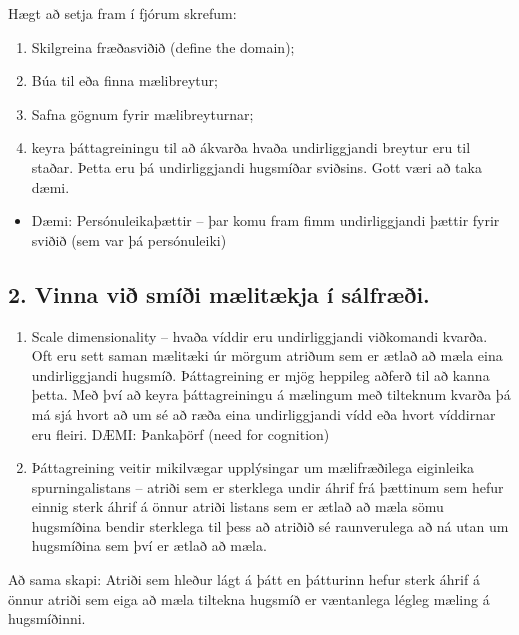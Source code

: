 \documentclass[]{book}
\providecommand{\tightlist}{%
  \setlength{\itemsep}{0pt}\setlength{\parskip}{0pt}}
\begin{document}
Hægt að setja fram í fjórum skrefum:

\begin{enumerate}
\def\labelenumi{\arabic{enumi})}
\tightlist
\item
  Skilgreina fræðasviðið (define the domain);
\item
  Búa til eða finna mælibreytur;
\item
  Safna gögnum fyrir mælibreyturnar;
\item
  keyra þáttagreiningu til að ákvarða hvaða undirliggjandi breytur eru til staðar. Þetta eru þá undirliggjandi hugsmíðar sviðsins.
  Gott væri að taka dæmi.
\end{enumerate}

\begin{itemize}
\tightlist
\item
  Dæmi: Persónuleikaþættir -- þar komu fram fimm undirliggjandi þættir fyrir sviðið (sem var þá persónuleiki)
\end{itemize}

\hypertarget{vinna-viuxf0-smuxeduxf0i-muxe6lituxe6kja-uxed-suxe1lfruxe6uxf0i.}{%
\subsection{2. Vinna við smíði mælitækja í sálfræði.}\label{vinna-viuxf0-smuxeduxf0i-muxe6lituxe6kja-uxed-suxe1lfruxe6uxf0i.}}

\begin{enumerate}
\def\labelenumi{\arabic{enumi})}
\item
  Scale dimensionality -- hvaða víddir eru undirliggjandi viðkomandi kvarða. Oft eru sett saman mælitæki úr mörgum atriðum sem er ætlað að mæla eina undirliggjandi hugsmíð. Þáttagreining er mjög heppileg aðferð til að kanna þetta. Með því að keyra þáttagreiningu á mælingum með tilteknum kvarða þá má sjá hvort að um sé að ræða eina undirliggjandi vídd eða hvort víddirnar eru fleiri.
  DÆMI: Þankaþörf (need for cognition)
\item
  Þáttagreining veitir mikilvægar upplýsingar um mælifræðilega eiginleika spurningalistans -- atriði sem er sterklega undir áhrif frá þættinum sem hefur einnig sterk áhrif á önnur atriði listans sem er ætlað að mæla sömu hugsmíðina bendir sterklega til þess að atriðið sé raunverulega að ná utan um hugsmíðina sem því er ætlað að mæla.
\end{enumerate}

Að sama skapi: Atriði sem hleður lágt á þátt en þátturinn hefur sterk áhrif á önnur atriði sem eiga að mæla tiltekna hugsmíð er væntanlega légleg mæling á hugsmíðinni.
\end{document}

